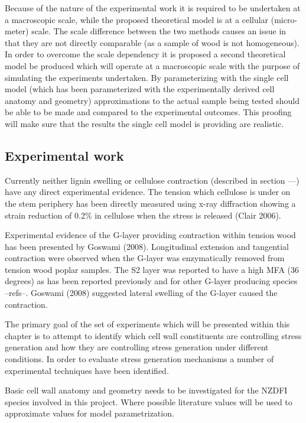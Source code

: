 \documentclass{article}
\begin{document}
Because of the nature of the experimental work it is required to be undertaken
at a macroscopic scale, while the proposed theoretical model is at a cellular
(micro-meter) scale. The scale difference between the two methods causes an
issue in that they are not directly comparable (as a sample of wood is not
homogeneous). In order to overcome the scale dependency it is proposed a second
theoretical model be produced which will operate at a macroscopic scale with the
purpose of simulating the experiments undertaken. By parameterizing with the
single cell model (which has been parameterized with the experimentally derived
cell anatomy and geometry) approximations to the actual sample being tested
should be able to be made and compared to the experimental outcomes. This
proofing will make sure that the results the single cell model is providing are
realistic.

\subsection{Experimental work}
Currently neither lignin swelling or cellulose contraction (described in section
---) have any direct experimental evidence. The tension which cellulose is under
on the stem periphery has been directly measured using x-ray diffraction showing
a strain reduction of 0.2\% in cellulose when the stress is released (Clair
2006).

Experimental evidence of the G-layer providing contraction within tension wood
has been presented by Goswami (2008). Longitudinal extension and tangential
contraction were observed when the G-layer was enzymatically removed from
tension wood poplar samples. The S2 layer was reported to have a high MFA (36
degrees) as has been reported previously and for other G-layer producing species
--refs--. Goswami (2008) suggested lateral swelling of the G-layer caused the
contraction.

The primary goal of the set of experiments which will be presented within this
chapter is to attempt to identify which cell wall constituents are controlling
stress generation and how they are controlling stress generation under different
conditions. In order to evaluate stress generation mechanisms a number of
experimental techniques have been identified.

Basic cell wall anatomy and geometry needs to be investigated for the NZDFI
species involved in this project. Where possible literature values will be used
to approximate values for model parametrization.
\end{document}
